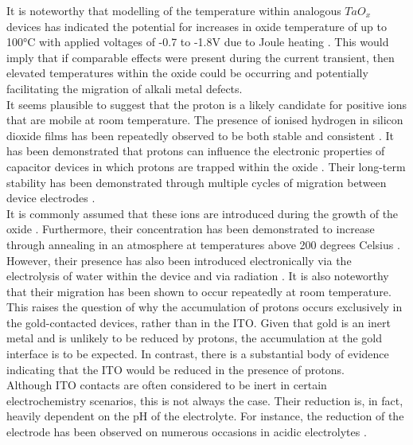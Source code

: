 \noindent It is noteworthy that modelling of the temperature within analogous $TaO_x$ devices has indicated the potential for increases in oxide temperature of up to 100°C with applied voltages of -0.7 to -1.8V due to Joule heating \cite{shen2021experimentally}. This would imply that if comparable effects were present during the current transient, then elevated temperatures within the oxide could be occurring and potentially facilitating the migration of alkali metal defects.\\

\noindent It seems plausible to suggest that the proton \cite{hofstein1967proton} is a likely candidate for positive ions that are mobile at room temperature. The presence of ionised hydrogen in silicon dioxide films has been repeatedly observed to be both stable and consistent \cite{vanheusden1998chemical}. It has been demonstrated that protons can influence the electronic properties of capacitor devices in which protons are trapped within the oxide \cite{vanheusden1999non}. Their long-term stability has been demonstrated through multiple cycles of migration between device electrodes \cite{warren1997protonic}. \\

\noindent It is commonly assumed that these ions are introduced during the growth of the oxide \cite{vanheusden1998thermally}. Furthermore, their concentration has been demonstrated to increase through annealing in an atmosphere at temperatures above 200 degrees Celsius \cite{lifshitz1989detection}. However, their presence has also been introduced electronically via the electrolysis of water within the device and via radiation \cite{winokur1977field}. It is also noteworthy that their migration has been shown to occur repeatedly at room temperature.\\

\noindent This raises the question of why the accumulation of protons occurs exclusively in the gold-contacted devices, rather than in the ITO. Given that gold is an inert metal and is unlikely to be reduced by protons, the accumulation at the gold interface is to be expected. In contrast, there is a substantial body of evidence indicating that the ITO would be reduced in the presence of protons.\\

\noindent Although ITO contacts are often considered to be inert in certain electrochemistry scenarios, this is not always the case. Their reduction is, in fact, heavily dependent on the pH of the electrolyte. For instance, the reduction of the electrode has been observed on numerous occasions in acidic electrolytes \cite{ciocci2021differentiating,senthilkumar2008electrochemical}. \\

